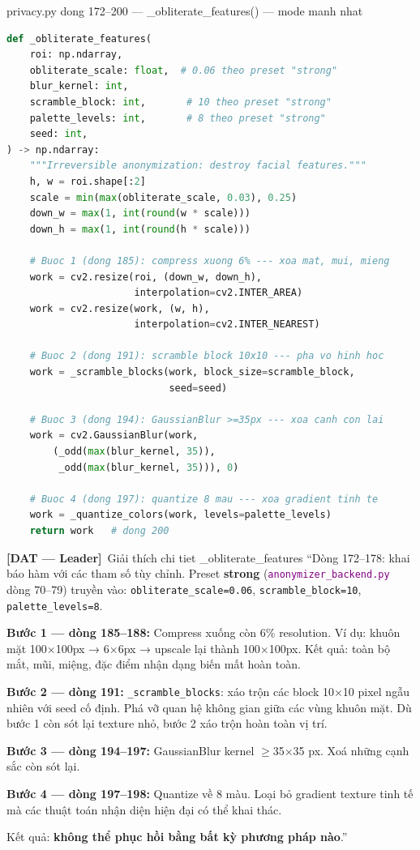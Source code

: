 \documentclass[12pt, a4paper]{article}
\newcommand{\dat}{\textcolor{BrickRed}{\textbf{[DAT --- Leader]}}}
\newcommand{\fpath}[1]{\texttt{\textcolor{purple}{#1}}}
\begin{document}
\begin{codestep}{privacy.py dong 172--200 --- \_obliterate\_features() --- mode manh nhat}
\begin{lstlisting}[language=Python, firstnumber=172]
def _obliterate_features(
    roi: np.ndarray,
    obliterate_scale: float,  # 0.06 theo preset "strong"
    blur_kernel: int,
    scramble_block: int,       # 10 theo preset "strong"
    palette_levels: int,       # 8 theo preset "strong"
    seed: int,
) -> np.ndarray:
    """Irreversible anonymization: destroy facial features."""
    h, w = roi.shape[:2]
    scale = min(max(obliterate_scale, 0.03), 0.25)
    down_w = max(1, int(round(w * scale)))
    down_h = max(1, int(round(h * scale)))

    # Buoc 1 (dong 185): compress xuong 6% --- xoa mat, mui, mieng
    work = cv2.resize(roi, (down_w, down_h),
                      interpolation=cv2.INTER_AREA)
    work = cv2.resize(work, (w, h),
                      interpolation=cv2.INTER_NEAREST)

    # Buoc 2 (dong 191): scramble block 10x10 --- pha vo hinh hoc
    work = _scramble_blocks(work, block_size=scramble_block,
                            seed=seed)

    # Buoc 3 (dong 194): GaussianBlur >=35px --- xoa canh con lai
    work = cv2.GaussianBlur(work,
        (_odd(max(blur_kernel, 35)),
         _odd(max(blur_kernel, 35))), 0)

    # Buoc 4 (dong 197): quantize 8 mau --- xoa gradient tinh te
    work = _quantize_colors(work, levels=palette_levels)
    return work   # dong 200
\end{lstlisting}
\end{codestep}

\begin{dialog}{\dat\ Giải thích chi tiet \_obliterate\_features}
``Dòng 172--178: khai báo hàm với các tham số tùy chỉnh.
Preset \textbf{strong} (\fpath{anonymizer\_backend.py} dòng 70--79)
truyền vào:
\texttt{obliterate\_scale=0.06}, \texttt{scramble\_block=10}, \texttt{palette\_levels=8}.

\textbf{Bước 1 --- dòng 185--188:}
Compress xuống còn 6\% resolution.
Ví dụ: khuôn mặt 100×100px → 6×6px → upscale lại thành 100×100px.
Kết quả: toàn bộ mắt, mũi, miệng, đặc điểm nhận dạng biến mất hoàn toàn.

\textbf{Bước 2 --- dòng 191:}
\texttt{\_scramble\_blocks}: xáo trộn các block 10×10 pixel ngẫu nhiên
với seed cố định. Phá vỡ quan hệ không gian giữa các vùng khuôn mặt.
Dù bước 1 còn sót lại texture nhỏ, bước 2 xáo trộn hoàn toàn vị trí.

\textbf{Bước 3 --- dòng 194--197:}
GaussianBlur kernel $\geq$35×35 px. Xoá những cạnh sắc còn sót lại.

\textbf{Bước 4 --- dòng 197--198:}
Quantize về 8 màu. Loại bỏ gradient texture tinh tế mà
các thuật toán nhận diện hiện đại có thể khai thác.

Kết quả: \textbf{không thể phục hồi bằng bất kỳ phương pháp nào}.''
\end{dialog}
\end{document}
